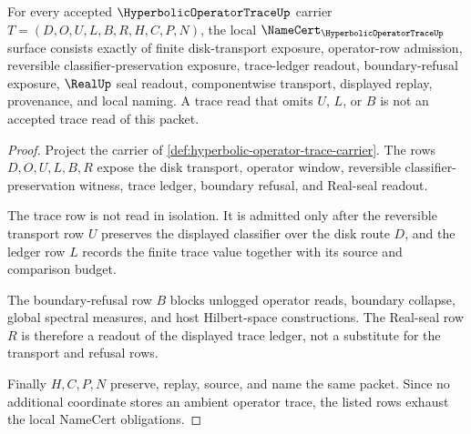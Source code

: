 \begin{theorem}
\label{thm:hyperbolic-operator-trace-namecert-obligations}
For every accepted $\HyperbolicOperatorTraceUp$ carrier $T=(D,O,U,L,B,R,H,C,P,N)$, the local $\NameCert_{\HyperbolicOperatorTraceUp}$ surface consists exactly of finite disk-transport exposure, operator-row admission, reversible classifier-preservation exposure, trace-ledger readout, boundary-refusal exposure, $\RealUp$ seal readout, componentwise transport, displayed replay, provenance, and local naming. A trace read that omits $U$, $L$, or $B$ is not an accepted trace read of this packet.
\end{theorem}
\begin{proof}
Project the carrier of \autoref{def:hyperbolic-operator-trace-carrier}. The rows $D,O,U,L,B,R$ expose the disk transport, operator window, reversible classifier-preservation witness, trace ledger, boundary refusal, and Real-seal readout.

The trace row is not read in isolation. It is admitted only after the reversible transport row $U$ preserves the displayed classifier over the disk route $D$, and the ledger row $L$ records the finite trace value together with its source and comparison budget.

The boundary-refusal row $B$ blocks unlogged operator reads, boundary collapse, global spectral measures, and host Hilbert-space constructions. The Real-seal row $R$ is therefore a readout of the displayed trace ledger, not a substitute for the transport and refusal rows.

Finally $H,C,P,N$ preserve, replay, source, and name the same packet. Since no additional coordinate stores an ambient operator trace, the listed rows exhaust the local NameCert obligations.
\end{proof}




